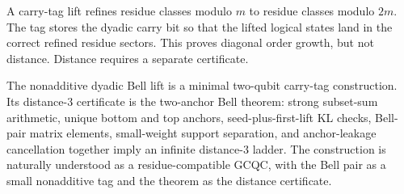 \documentclass[11pt]{article}
\begin{document}
A carry-tag lift refines residue classes modulo $m$ to residue classes modulo $2m$.  The tag stores
the dyadic carry bit so that the lifted logical states land in the correct refined residue sectors.
This proves diagonal order growth, but not distance.  Distance requires a separate certificate.

The nonadditive dyadic Bell lift is a minimal two-qubit carry-tag construction.  Its distance-$3$
certificate is the two-anchor Bell theorem: strong subset-sum arithmetic, unique bottom and top
anchors, seed-plus-first-lift KL checks, Bell-pair matrix elements, small-weight support separation,
and anchor-leakage cancellation together imply an infinite distance-$3$ ladder.  The construction
is naturally understood as a residue-compatible GCQC, with the Bell pair as a small nonadditive tag
and the theorem as the distance certificate.
\end{document}
